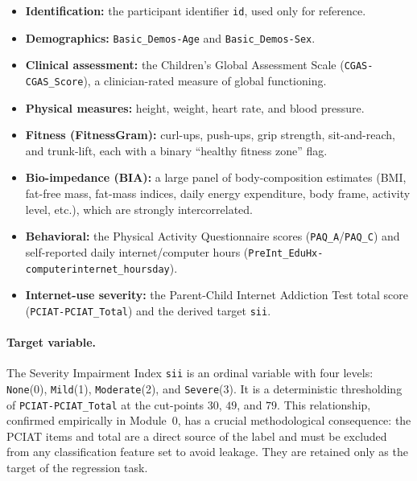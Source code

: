 \begin{itemize}
    \item \textbf{Identification:} the participant identifier \texttt{id}, used only for reference.
    \item \textbf{Demographics:} \texttt{Basic\_Demos-Age} and \texttt{Basic\_Demos-Sex}.
    \item \textbf{Clinical assessment:} the Children's Global Assessment Scale (\texttt{CGAS-CGAS\_Score}), a clinician-rated measure of global functioning.
    \item \textbf{Physical measures:} height, weight, heart rate, and blood pressure.
    \item \textbf{Fitness (FitnessGram):} curl-ups, push-ups, grip strength, sit-and-reach, and trunk-lift, each with a binary ``healthy fitness zone'' flag.
    \item \textbf{Bio-impedance (BIA):} a large panel of body-composition estimates (BMI, fat-free mass, fat-mass indices, daily energy expenditure, body frame, activity level, etc.), which are strongly intercorrelated.
    \item \textbf{Behavioral:} the Physical Activity Questionnaire scores (\texttt{PAQ\_A}/\texttt{PAQ\_C}) and self-reported daily internet/computer hours (\texttt{PreInt\_EduHx-computerinternet\_hoursday}).
    \item \textbf{Internet-use severity:} the Parent-Child Internet Addiction Test total score (\texttt{PCIAT-PCIAT\_Total}) and the derived target \texttt{sii}.
\end{itemize}

\paragraph{Target variable.} The Severity Impairment Index \texttt{sii} is an ordinal variable with four levels: \texttt{None}(0), \texttt{Mild}(1), \texttt{Moderate}(2), and \texttt{Severe}(3). It is a deterministic thresholding of \texttt{PCIAT-PCIAT\_Total} at the cut-points $30$, $49$, and $79$. This relationship, confirmed empirically in Module~0, has a crucial methodological consequence: the PCIAT items and total are a direct source of the label and must be excluded from any classification feature set to avoid leakage. They are retained only as the target of the regression task.\\

